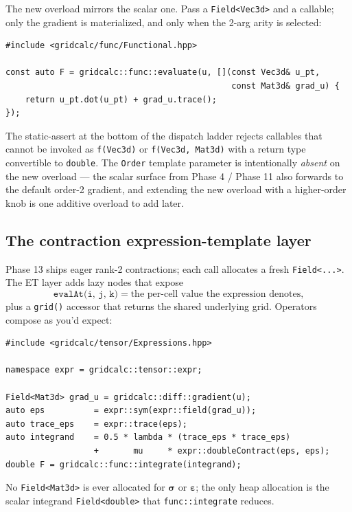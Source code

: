 The new overload mirrors the scalar one. Pass a
\passthrough{\lstinline!Field<Vec3d>!} and a callable; only the
gradient is materialized, and only when the 2-arg arity is selected:

\begin{verbatim}
#include <gridcalc/func/Functional.hpp>

const auto F = gridcalc::func::evaluate(u, [](const Vec3d& u_pt,
                                              const Mat3d& grad_u) {
    return u_pt.dot(u_pt) + grad_u.trace();
});
\end{verbatim}

The static-assert at the bottom of the dispatch ladder rejects callables
that cannot be invoked as \passthrough{\lstinline!f(Vec3d)!} or
\passthrough{\lstinline!f(Vec3d, Mat3d)!} with a return type
convertible to \passthrough{\lstinline!double!}. The
\passthrough{\lstinline!Order!} template parameter is intentionally
\emph{absent} on the new overload --- the scalar surface from
Phase 4 / Phase 11 also forwards to the default order-2 gradient, and
extending the new overload with a higher-order knob is one additive
overload to add later.

\subsection{The contraction expression-template layer}\label{phase15-et}

Phase 13 ships eager rank-2 contractions; each call allocates a fresh
\passthrough{\lstinline!Field<...>!}. The ET layer adds lazy nodes that
expose
\[
\texttt{evalAt(i, j, k)}\;=\;\text{the per-cell value the expression denotes,}
\]
plus a \passthrough{\lstinline!grid()!} accessor that returns the
shared underlying grid. Operators compose as you'd expect:

\begin{verbatim}
#include <gridcalc/tensor/Expressions.hpp>

namespace expr = gridcalc::tensor::expr;

Field<Mat3d> grad_u = gridcalc::diff::gradient(u);
auto eps          = expr::sym(expr::field(grad_u));
auto trace_eps    = expr::trace(eps);
auto integrand    = 0.5 * lambda * (trace_eps * trace_eps)
                  +       mu     * expr::doubleContract(eps, eps);
double F = gridcalc::func::integrate(integrand);
\end{verbatim}

No \passthrough{\lstinline!Field<Mat3d>!} is ever allocated for
\(\boldsymbol{\sigma}\) or \(\boldsymbol{\varepsilon}\); the only
heap allocation is the scalar integrand
\passthrough{\lstinline!Field<double>!} that
\passthrough{\lstinline!func::integrate!} reduces.


